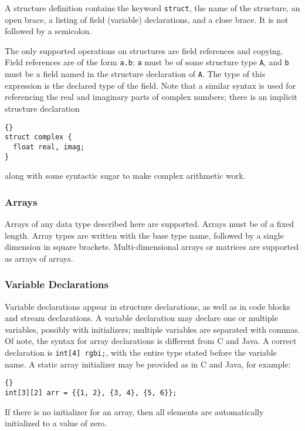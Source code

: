 \documentclass[11pt]{article}
\begin{document}
A structure definition contains the keyword \lstinline|struct|, the name
of the structure, an open brace, a listing of field (variable)
declarations, and a close brace.  It is not followed by a semicolon.

The only supported operations on structures are field references and
copying.  Field references are of the form \lstinline|a.b|; \lstinline|a| must
be of some structure type \lstinline|A|, and \lstinline|b| must be a field named
in the structure declaration of \lstinline|A|.  The type of this expression
is the declared type of the field.  Note that a similar syntax is used
for referencing the real and imaginary parts of complex numbers; there
is an implicit structure declaration

\begin{lstlisting}{}
struct complex {
  float real, imag;
}
\end{lstlisting}{}

\noindent
along with some syntactic sugar to make complex arithmetic work.

\subsubsection{Arrays}

Arrays of any data type described here are supported.  Arrays must be
of a fixed length.  Array types are written with the base type name,
followed by a single dimension in square brackets.  Multi-dimensional
arrays or matrices are supported as arrays of arrays.

\subsubsection{Variable Declarations}

Variable declarations appear in structure declarations, as well as in
code blocks and stream declarations.  A variable declaration may
declare one or multiple variables, possibly with initializers;
multiple variables are separated with commas.  Of note, the syntax for
array declarations is different from C and Java.  A correct
declaration is \lstinline|int[4] rgbi;|, with the entire type stated
before the variable name.  A static array initializer may be provided
as in C and Java, for example:

\begin{lstlisting}{}
int[3][2] arr = {{1, 2}, {3, 4}, {5, 6}};
\end{lstlisting}{}

If there is no initializer for an array, then all elements are
automatically initialized to a value of zero.
\end{document}
